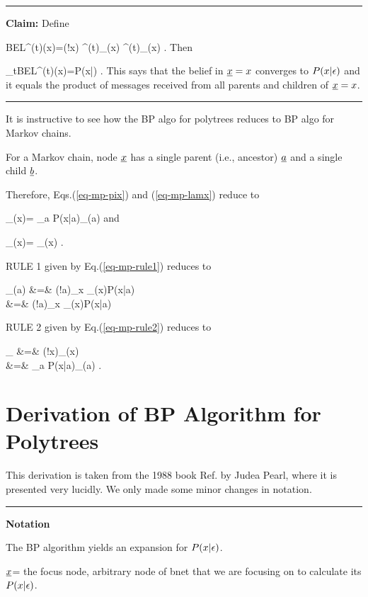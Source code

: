 \hrule\noindent
{\bf Claim:} Define

\beq
BEL^{(t)}(x)=\caln(!x)
\lam^{(t)}_\rvx(x)
\pi^{(t)}_\rvx(x)
\;.\eeq
Then

\beq
\lim_{t\rarrow \infty}BEL^{(t)}(x)=P(x|\eps)
\;.
\eeq
This  says that
the belief in ${\underline{x}}=x$
converges to $P(x|\epsilon)$ and it
equals the product
of messages received from all
parents and children of ${\underline{x}}=x$.

\hrule{}

It is instructive
to see
how the
BP algo
for polytrees reduces to 
BP algo for Markov chains.

For a Markov chain, node
${\underline{x}}$ has a single parent (i.e., ancestor) ${\underline{a}}$
and a single child ${\underline{b}}$.

Therefore, 
Eqs.(\ref{eq-mp-pix}) and (\ref{eq-mp-lamx}) reduce to

\beq
\pi_\rvx(x)=
\sum_a
P(x|a)\pi_{\rvx\ldart\rva}(a)
\eeq
and

\beq
\lam_\rvx(x)=
\lam_{\rvb\rdart \rvx}(x)
\;.
\eeq

RULE 1 given by Eq.(\ref{eq-mp-rule1}) reduces to

\beqa
\lam_{\rvx\rdart \rva}(a)
&=&
\caln(!a)\sum_x
\lam_\rvx(x)P(x|a) 
\\
&=&
\caln(!a)\sum_x
\lam_{\rvb\rdart \rvx}(x)P(x|a) 
\eeqa

RULE 2 given by Eq.(\ref{eq-mp-rule2}) reduces to

\beqa
\pi_{\rvb\ldart \rvx}
&=&
\caln(!x)\pi_\rvx(x)
\\
&=&
\sum_a
P(x|a)\pi_{\rvx\ldart\rva}(a)
\;.
\eeqa



\section*{Derivation of BP Algorithm
for Polytrees}

This derivation is taken from
 the 1988 book Ref.\cite{pearl-1988book}
by Judea Pearl, where it
is presented very lucidly. We only
made some minor
changes in notation.

\hrule\noindent
 {\bf Notation}

The BP algorithm yields an expansion
 for $P(x|\epsilon)$.

${\underline{x}}$= the focus node,
arbitrary node of bnet that we are
focusing on to calculate its $P(x|\epsilon)$.




